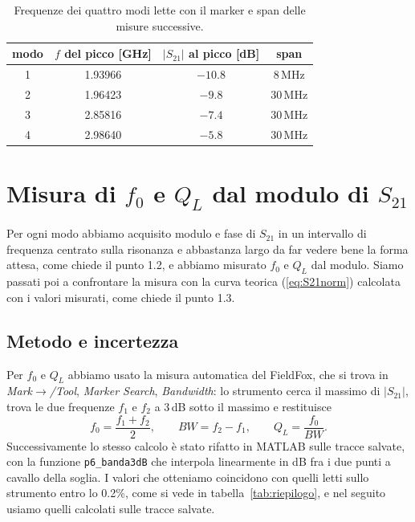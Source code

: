 \documentclass[11pt,a4paper,oneside]{book}
\begin{document}
\begin{table}[H]
\centering
\renewcommand{\arraystretch}{1.2}
\begin{tabular}{c c c c}
\hline
modo & $f$ del picco [GHz] & $|S_{21}|$ al picco [dB] & span \\ \hline
1 & 1.93966 & $-10.8$ & 8\,MHz \\
2 & 1.96423 & $-9.8$ & 30\,MHz \\
3 & 2.85816 & $-7.4$ & 30\,MHz \\
4 & 2.98640 & $-5.8$ & 30\,MHz \\ \hline
\end{tabular}
\caption{Frequenze dei quattro modi lette con il marker e span delle misure successive.}
\label{tab:modi}
\end{table}

\chapter{Misura di $f_0$ e $Q_L$ dal modulo di $S_{21}$}
\label{cap:modulo}

Per ogni modo abbiamo acquisito modulo e fase di $S_{21}$ in un intervallo di frequenza centrato sulla risonanza e abbastanza largo da far vedere bene la forma attesa, come chiede il punto 1.2, e abbiamo misurato $f_0$ e $Q_L$ dal modulo. Siamo passati poi a confrontare la misura con la curva teorica (\ref{eq:S21norm}) calcolata con i valori misurati, come chiede il punto 1.3.

\section{Metodo e incertezza}
Per $f_0$ e $Q_L$ abbiamo usato la misura automatica del FieldFox, che si trova in \emph{Mark}$\rightarrow$\emph{/Tool}, \emph{Marker Search}, \emph{Bandwidth}: lo strumento cerca il massimo di $|S_{21}|$, trova le due frequenze $f_1$ e $f_2$ a 3\,dB sotto il massimo e restituisce
\begin{equation}
f_0=\frac{f_1+f_2}{2},\qquad BW=f_2-f_1,\qquad Q_L=\frac{f_0}{BW}.
\label{eq:banda}
\end{equation}
Successivamente lo stesso calcolo è stato rifatto in MATLAB sulle tracce salvate, con la funzione \texttt{p6\_banda3dB} che interpola linearmente in dB fra i due punti a cavallo della soglia. I valori che otteniamo coincidono con quelli letti sullo strumento entro lo 0.2\%, come si vede in tabella~\ref{tab:riepilogo}, e nel seguito usiamo quelli calcolati sulle tracce salvate.
\end{document}
